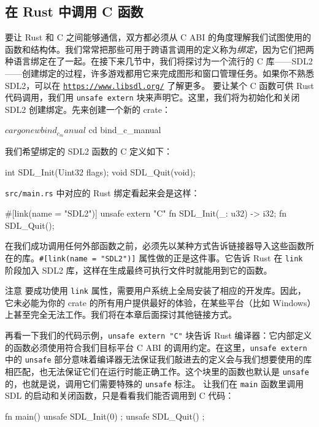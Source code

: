 \subsection{在 Rust 中调用 C 函数}
\label{idx:idx_c4addb7d}
要让 Rust 和 C 之间能够通信，双方都必须从 C ABI 的角度理解我们试图使用的函数和结构体。我们常常把那些可用于跨语言调用的定义称为\emph{绑定}，因为它们把两种语言绑定在了一起。在接下来几节中，我们将探讨为一个流行的 C 库——SDL2——创建绑定的过程，许多游戏都用它来完成图形和窗口管理任务。如果你不熟悉 SDL2，可以在 \href{https://www.libsdl.org/}{\texttt{https:/\allowbreak{}/\allowbreak{}www.\allowbreak{}libsdl.\allowbreak{}org/\allowbreak{}}} 了解更多。
要让某个 C 函数可供 Rust 代码调用，我们用 \texttt{unsafe extern} 块来声明它。这里，我们将为初始化和关闭 SDL2 创建绑定。先来创建一个新的 crate：
\begin{codeboxdark}
$ cargo new bind_c_manual
$ cd bind_c_manual
\end{codeboxdark}
我们希望绑定的 SDL2 函数的 C 定义如下：
\begin{codebox}[text]
int SDL_Init(Uint32 flags);
void SDL_Quit(void);
\end{codebox}
\texttt{src/main.rs} 中对应的 Rust 绑定看起来会是这样：
\begin{codebox}[rust]
#[link(name = "SDL2")]
unsafe extern "C" {
    fn SDL_Init(_: u32) -> i32;
    fn SDL_Quit();
}
\end{codebox}
\label{idx:idx_1465dbd8}
在我们成功调用任何外部函数之前，必须先以某种方式告诉链接器导入这些函数所在的库。\texttt{\#[\allowbreak{}link(\allowbreak{}name =\allowbreak{} "SDL2")\allowbreak{}]\allowbreak{}} 属性做的正是这件事。它告诉 Rust 在 \texttt{link} 阶段加入 SDL2 库，这样在生成最终可执行文件时就能用到它的函数。
\begin{myNotic}{注意}
要成功使用 \texttt{link} 属性，需要用户系统上全局安装了相应的开发库。因此，它未必能为你的 crate 的所有用户提供最好的体验，在某些平台（比如 Windows）上甚至完全无法工作。我们将在本章后面探讨其他链接方式。
\end{myNotic}
再看一下我们的代码示例，\texttt{unsafe extern "C"} 块告诉 Rust 编译器：它内部定义的函数必须使用符合我们目标平台 C ABI 的调用约定。在这里，\texttt{unsafe extern} 中的 \texttt{unsafe} 部分意味着编译器无法保证我们敲进去的定义会与我们想要使用的库相匹配，也无法保证它们在运行时能正确工作。这个块里的函数也默认是 \texttt{unsafe} 的，也就是说，调用它们需要特殊的 \texttt{unsafe} 标注。
让我们在 \texttt{main} 函数里调用 SDL 的启动和关闭函数，只是看看我们能否调用到 C 代码：
\begin{codebox}[rust]
fn main() {
    unsafe { SDL_Init(0) };
    unsafe { SDL_Quit() };
}
\end{codebox}
